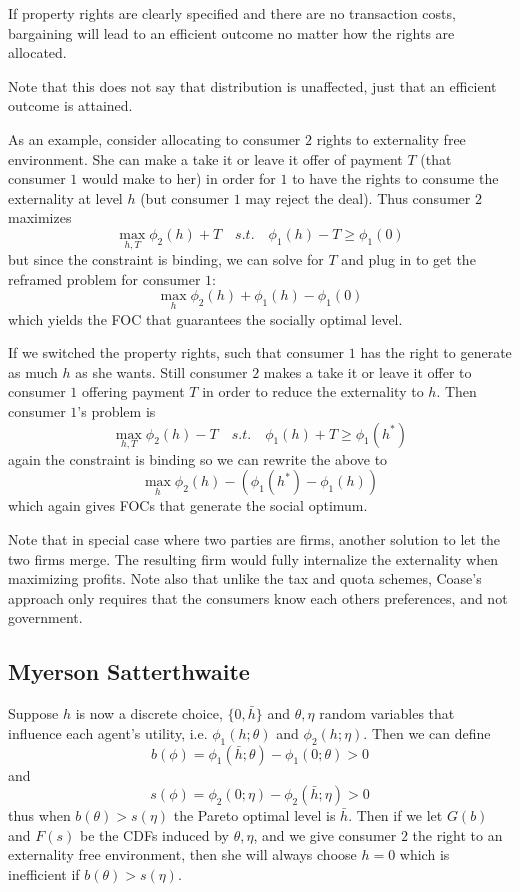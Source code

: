 \begin{theorem}[Coase]
  If property rights are clearly specified and there are no
  transaction costs, bargaining will lead to an efficient outcome no
  matter how the rights are allocated.
\end{theorem}

Note that this does not say that distribution is unaffected, just that
an efficient outcome is attained.

As an example, consider allocating to consumer $2$ rights to
externality free environment. She can make a take it or leave it offer
of payment $T$ (that consumer $1$ would make to her) in order for $1$
to have the rights to consume the externality at level $h$ (but
consumer $1$ may reject the deal). Thus consumer $2$ maximizes
\[
\max_{h, T} \phi_2(h) + T \quad s.t. \quad \phi_1(h) - T \geq \phi_1(0)
\]
but since the constraint is binding, we can solve for $T$ and plug in
to get the reframed problem for consumer $1$:
\[
\max_h \phi_2(h) + \phi_1(h) - \phi_1(0)
\]
which yields the FOC that guarantees the socially optimal level.

If we switched the property rights, such that consumer $1$ has the
right to generate as much $h$ as she wants. Still consumer $2$ makes a
take it or leave it offer to consumer $1$ offering payment $T$ in
order to reduce the externality to $h$. Then consumer $1$'s problem is
\[
\max_{h,T} \phi_2(h) - T \quad s.t. \quad \phi_1(h) + T \geq \phi_1(h^*)
\]
again the constraint is binding so we can rewrite the above to
\[
\max_h \phi_2(h) - (\phi_1(h^*) - \phi_1(h))
\]
which again gives FOCs that generate the social optimum.

Note that in special case where two parties are firms, another
solution to let the two firms merge. The resulting firm would fully
internalize the externality when maximizing profits. Note also that
unlike the tax and quota schemes, Coase’s approach only requires that
the consumers know each others preferences, and not government.



\subsection{Myerson Satterthwaite}
\label{sec:myers-satt}

Suppose $h$ is now a discrete choice, $\{0, \bar h\}$ and $\theta,
\eta$ random variables that influence each agent's utility, i.e.
$\phi_1(h; \theta)$ and $\phi_2(h; \eta)$. Then we can define
\[
b(\phi) = \phi_1(\bar h; \theta) - \phi_1(0; \theta) > 0
\]
and
\[
s(\phi) = \phi_2(0; \eta) - \phi_2(\bar h; \eta) > 0
\]
thus when $b(\theta) > s(\eta)$ the Pareto optimal level is $\bar
h$. Then if we let $G(b)$ and $F(s)$ be the CDFs induced by $\theta,
\eta$, and we give consumer $2$ the right to an externality free
environment, then she will always choose $h=0$ which is inefficient if
$b(\theta) > s(\eta)$.

